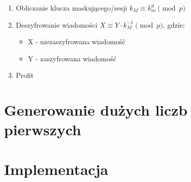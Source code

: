 \documentclass{article}
\begin{document}
\begin{enumerate}
        \begin{enumerate}
            \item Obliczanie klucza maskującego/sesji $ k_M \equiv k_m ^ {d} \pmod p $
            \item Deszyfrowanie wiadomości $X \equiv Y \cdot k_M^{-1} \pmod p$, gdzie:
            \begin{itemize}
                \item X - niezaszyfrowana wiadomość
                \item Y - zaszyfrowana wiadomość
            \end{itemize}
            \item Profit
        \end{enumerate}
    \end{enumerate}
    \section{Generowanie dużych liczb pierwszych}
    \section{Implementacja}
    
\end{document}
